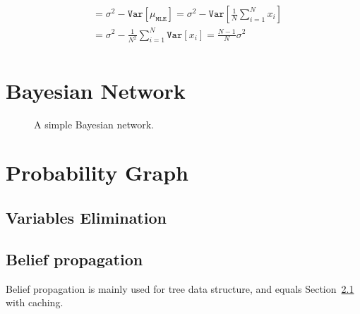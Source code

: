 \begin{align}
	                                                   & = \sigma^2 -  \mathtt{Var}\left[\mu_{\mathtt{MLE}}\right]  =  \sigma^2 - \mathtt{Var}\left[\frac{1}{N} \sum_{i=1}^N x_i \right]                                                                                                                             \\
	                                                   & = \sigma^2 - \frac{1}{N^2} \sum_{i=1}^N \mathtt{Var}\left[x_i\right] = \frac{N-1}{N} \sigma^2                                                                                                                                                               \\
\end{align}


\section{Bayesian Network} %
\label{sec:Bayesian Network}

\begin{figure}
	\centering
	
	\caption{A simple Bayesian network.}\label{fig:bn_simple_graph}
\end{figure}


\section{Probability Graph} %
\label{sec:Probability Graph}


\subsection{Variables Elimination} %
\label{sub:Variables Elimination}


\subsection{Belief propagation} %
\label{sub:Belief propagation}

Belief propagation is mainly used for tree data structure, and equals Section~\ref{sub:Variables Elimination} with caching.

